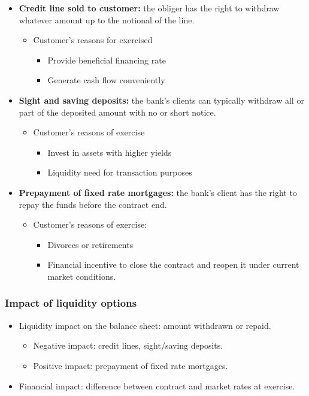 \begin{itemize}
\item \textbf{Credit line sold to customer:} the obliger has the right to withdraw whatever amount up to the notional of the line.
    \begin{itemize}
    \item Customer's reasons for exercised
        \begin{itemize}
        \item Provide beneficial financing rate
        \item  Generate cash flow conveniently
        \end{itemize}
    \end{itemize}
\item \textbf{Sight and saving deposits:} the bank's clients can typically withdraw all or part of the deposited amount with no or short
notice.
    \begin{itemize}
    \item Customer's reasons of exercise
        \begin{itemize}
        \item Invest in assets with higher yields
        \item Liquidity need for transaction purposes
        \end{itemize}
    \end{itemize}
\item \textbf{Prepayment of fixed rate mortgages:} the bank's client has the right to repay the funds before the contract end.
    \begin{itemize}
    \item Customer's reasons of exercise:
        \begin{itemize}
        \item Divorces or retirements
        \item Financial incentive to close the contract and reopen it under current market conditions.
        \end{itemize}
    \end{itemize}
\end{itemize}

\subsubsection{Impact of liquidity options}

\begin{itemize}
\item Liquidity impact on the balance sheet: amount withdrawn or repaid.
    \begin{itemize}

    \item Negative impact: credit lines, sight/saving deposits.
    \item Positive impact: prepayment of fixed rate mortgages.
    \end{itemize}
\item Financial impact: difference between contract and market rates at exercise.

\end{itemize}

